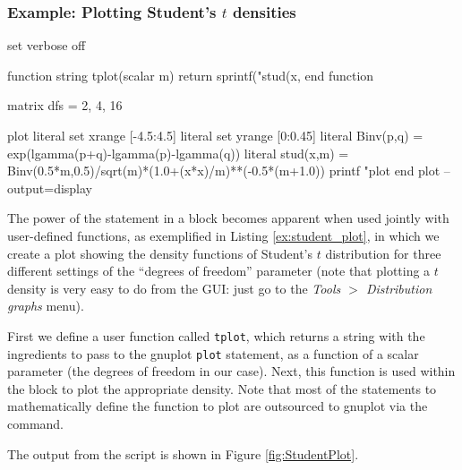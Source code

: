 \subsubsection{Example: Plotting Student's $t$ densities}

\begin{script}[htbp]
\begin{scode}
set verbose off

function string tplot(scalar m)
    return sprintf("stud(x,%
end function

matrix dfs = {2, 4, 16}

plot
    literal set xrange [-4.5:4.5]
    literal set yrange [0:0.45]
    literal Binv(p,q) = exp(lgamma(p+q)-lgamma(p)-lgamma(q))
    literal stud(x,m) = Binv(0.5*m,0.5)/sqrt(m)*(1.0+(x*x)/m)**(-0.5*(m+1.0))
    printf "plot %
end plot --output=display
\end{scode}
\end{script}

The power of the  statement in a  block becomes
apparent when used jointly with user-defined functions, as exemplified
in Listing \ref{ex:student_plot}, in which we create a plot showing
the density functions of Student's $t$ distribution for three
different settings of the ``degrees of freedom'' parameter (note that
plotting a $t$ density is very easy to do from the GUI: just go to the
\emph{Tools $>$ Distribution graphs} menu).

First we define a user function called \texttt{tplot}, which returns a
string with the ingredients to pass to the gnuplot \texttt{plot}
statement, as a function of a scalar parameter (the degrees of freedom
in our case). Next, this function is used within the  block
to plot the appropriate density. Note that most of the 
statements to mathematically define the function to plot are
outsourced to gnuplot via the  command.

The output from the script is shown in Figure \ref{fig:StudentPlot}.

